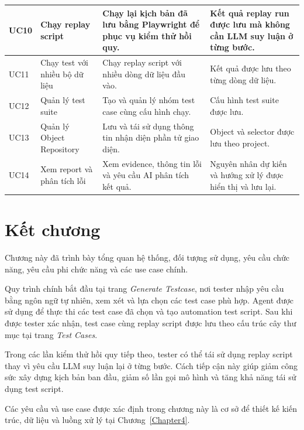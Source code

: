 {\begin{longtable}{|p{1.4cm}|p{3.6cm}|p{5.5cm}|p{3.8cm}|}
UC10 &
Chạy replay script &
Chạy lại kịch bản đã lưu bằng Playwright để phục vụ kiểm thử hồi quy. &
Kết quả replay run được lưu mà không cần LLM suy luận ở từng bước. \\
\hline

UC11 &
Chạy test với nhiều bộ dữ liệu &
Chạy replay script với nhiều dòng dữ liệu đầu vào. &
Kết quả được lưu theo từng dòng dữ liệu. \\
\hline

UC12 &
Quản lý test suite &
Tạo và quản lý nhóm test case cùng cấu hình chạy. &
Cấu hình test suite được lưu. \\
\hline

UC13 &
Quản lý Object Repository &
Lưu và tái sử dụng thông tin nhận diện phần tử giao diện. &
Object và selector được lưu theo project. \\
\hline

UC14 &
Xem report và phân tích lỗi &
Xem evidence, thông tin lỗi và yêu cầu AI phân tích kết quả. &
Nguyên nhân dự kiến và hướng xử lý được hiển thị và lưu lại. \\
\hline

\end{longtable}
}

\section{Kết chương}

Chương này đã trình bày tổng quan hệ thống, đối tượng sử dụng, yêu cầu chức năng, yêu cầu phi chức năng và các use case chính.

Quy trình chính bắt đầu tại trang \textit{Generate Testcase}, nơi tester nhập yêu cầu bằng ngôn ngữ tự nhiên, xem xét và lựa chọn các test case phù hợp. Agent được sử dụng để thực thi các test case đã chọn và tạo automation test script. Sau khi được tester xác nhận, test case cùng replay script được lưu theo cấu trúc cây thư mục tại trang \textit{Test Cases}.

Trong các lần kiểm thử hồi quy tiếp theo, tester có thể tái sử dụng replay script thay vì yêu cầu LLM suy luận lại ở từng bước. Cách tiếp cận này giúp giảm công sức xây dựng kịch bản ban đầu, giảm số lần gọi mô hình và tăng khả năng tái sử dụng test script.

Các yêu cầu và use case được xác định trong chương này là cơ sở để thiết kế kiến trúc, dữ liệu và luồng xử lý tại Chương~\ref{Chapter4}.
